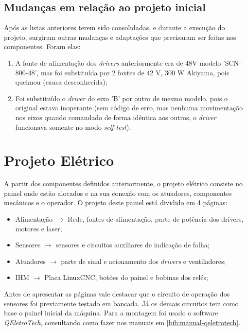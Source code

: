 \documentclass[
	article,			%
	11pt,				%
	oneside,			%
	a4paper,			%
	section=TITLE,		%
	english,			%
	brazil,				%
	sumario=tradicional
	]{abntex2}
\newcommand{\LCNC}{LinuxCNC}
\begin{document}
\subsection{Mudanças em relação ao projeto inicial}
Após as listas anteriores terem sido consolidadas, e durante a execução do projeto, surgiram outras mudanças e adaptações que precisaram ser feitas nos componentes. Foram elas:
\begin{enumerate}
    \item A fonte de alimentação dos \textit{drivers} anteriormente era de 48V modelo 'SCN-800-48', mas foi substituída por 2 fontes de 42 V, 300 W Akiyama, pois queimou (causa desconhecida);
    \item Foi substituído o \textit{driver} do eixo 'B' por outro de mesmo modelo, pois o original estava inoperante (sem código de erro, mas nenhuma movimentação nos eixos quando comandado de forma idêntica aos outros, o \textit{driver} funcionava somente no modo \textit{self-test}).
\end{enumerate}

\section{Projeto Elétrico}

A partir dos componentes definidos anteriormente, o projeto elétrico consiste no painel onde estão alocados e na sua conexão com os atuadores, componentes mecânicos e o operador. O projeto deste painel está dividido em 4 páginas: 
\begin{itemize}
\item Alimentação $\longrightarrow{}$ Rede, fontes de alimentação, parte de potência dos drivers, motores e laser;
\item Sensores $\longrightarrow{}$ sensores e circuitos auxiliares de indicação de falha;
\item Atuadores $\longrightarrow{}$ parte de sinal e acionamento dos \textit{drivers} e ventiladores;
\item IHM $\longrightarrow{}$ Placa \LCNC, botões do painel e bobinas dos relés;
\end{itemize}

Antes de apresentar as páginas vale destacar que o circuito de operação dos sensores foi previamente testado em bancada. Já os demais circuitos tem como base o painel inicial da máquina. Para a montagem foi usado o software \textit{QEletroTech}, consultando como fazer nos manuais em \ref{bib:manual-qeletrotech}.
\end{document}
